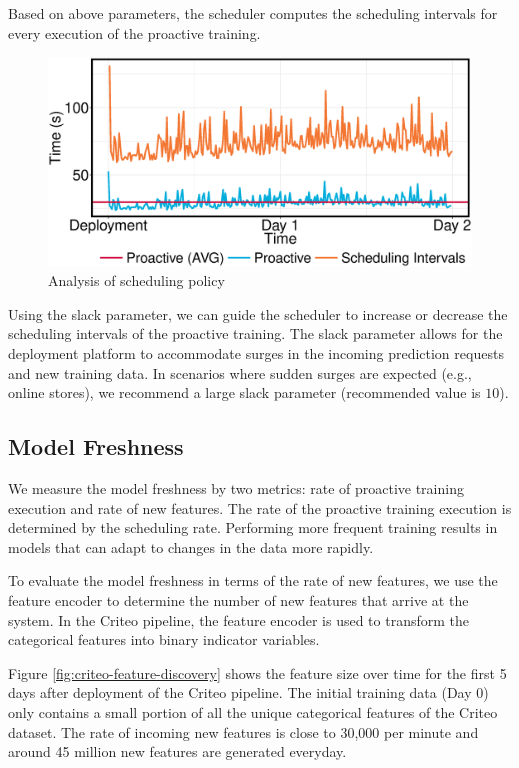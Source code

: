 Based on above parameters, the scheduler computes the scheduling intervals for every execution of the proactive training.

\begin{figure}[h!]
\centering
\includegraphics[width=\columnwidth]{../images/experiment-results/criteo-scheduling-experiment.eps}
\caption{Analysis of scheduling policy}
\label{fig:scheduling-policy-time}
\vspace{2mm}
\end{figure}

Using the slack parameter, we can guide the scheduler to increase or decrease the scheduling intervals of the proactive training.
The slack parameter allows for the deployment platform to accommodate surges in the incoming prediction requests and new training data.
In scenarios where sudden surges are expected (e.g., online stores), we recommend a large slack parameter (recommended value is $10$). 


\subsection{Model Freshness}\label{subsec:model-freshness}
We measure the model freshness by two metrics: rate of proactive training execution and rate of new features.
The rate of the proactive training execution is determined by the scheduling rate.
Performing more frequent training results in models that can adapt to changes in the data more rapidly.

To evaluate the model freshness in terms of the rate of new features, we use the feature encoder to determine the number of new features that arrive at the system.
In the Criteo pipeline, the feature encoder is used to transform the categorical features into binary indicator variables.

Figure \ref{fig:criteo-feature-discovery} shows the feature size over time for the first 5 days after deployment of the Criteo pipeline.
The initial training data (Day 0) only contains a small portion of all the unique categorical features of the Criteo dataset.
The rate of incoming new features is close to 30,000 per minute and  around 45 million new features are generated everyday.

